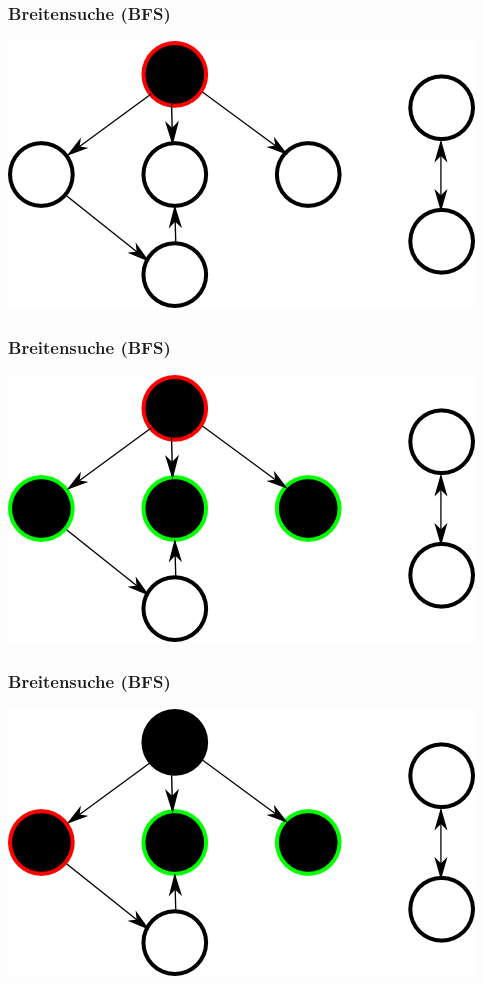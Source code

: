 \documentclass{beamer}
\begin{document}
\begin{frame}
\frametitle{Breitensuche (BFS)}
\includegraphics{bfs1}
\end{frame}


\begin{frame}
\frametitle{Breitensuche (BFS)}
\includegraphics{bfs2}
\end{frame}


\begin{frame}
\frametitle{Breitensuche (BFS)}
\includegraphics{bfs3}
\end{frame}
\end{document}
